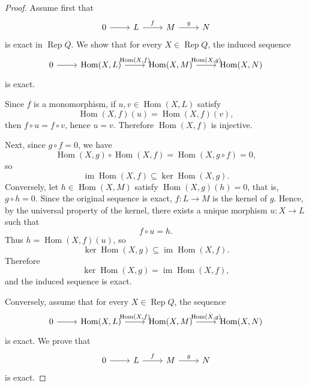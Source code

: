 \documentclass[11pt, a4paper]{report}
\begin{document}
\begin{proof}
    Assume first that
    \[
        \begin{tikzcd}
            0 \arrow[r] & L \arrow[r,"f"] & M \arrow[r,"g"] & N
        \end{tikzcd}
    \]
    is exact in $\operatorname{Rep}Q$. We show that for every $X \in \operatorname{Rep}Q$, the induced sequence
    \[
        \begin{tikzcd}
            0 \arrow[r] & {\operatorname{Hom}(X,L)} \arrow[r,"{\operatorname{Hom}(X,f)}"] &
            {\operatorname{Hom}(X,M)} \arrow[r,"{\operatorname{Hom}(X,g)}"] &
            \operatorname{Hom}(X,N)
        \end{tikzcd}
    \]
    is exact.

    Since $f$ is a monomorphism, if $u,v \in \operatorname{Hom}(X,L)$ satisfy
    \[
        \operatorname{Hom}(X,f)(u)=\operatorname{Hom}(X,f)(v),
    \]
    then $f\circ u=f\circ v$, hence $u=v$. Therefore $\operatorname{Hom}(X,f)$ is injective.

    Next, since $g\circ f=0$, we have
    \[
        \operatorname{Hom}(X,g)\circ \operatorname{Hom}(X,f)
        =\operatorname{Hom}(X,g\circ f)=0,
    \]
    so
    \[
        \operatorname{im}\operatorname{Hom}(X,f)\subseteq \ker \operatorname{Hom}(X,g).
    \]
    Conversely, let $h \in \operatorname{Hom}(X,M)$ satisfy $\operatorname{Hom}(X,g)(h)=0$, that is, $g\circ h=0$. Since the original sequence is exact, $f:L\to M$ is the kernel of $g$. Hence, by the universal property of the kernel, there exists a unique morphism $u:X\to L$ such that
    \[
        f\circ u=h.
    \]
    Thus $h=\operatorname{Hom}(X,f)(u)$, so
    \[
        \ker \operatorname{Hom}(X,g)\subseteq \operatorname{im}\operatorname{Hom}(X,f).
    \]
    Therefore
    \[
        \ker \operatorname{Hom}(X,g)=\operatorname{im}\operatorname{Hom}(X,f),
    \]
    and the induced sequence is exact.

    Conversely, assume that for every $X \in \operatorname{Rep}Q$, the sequence
    \[
        \begin{tikzcd}
            0 \arrow[r] & {\operatorname{Hom}(X,L)} \arrow[r,"{\operatorname{Hom}(X,f)}"] &
            {\operatorname{Hom}(X,M)} \arrow[r,"{\operatorname{Hom}(X,g)}"] &
            \operatorname{Hom}(X,N)
        \end{tikzcd}
    \]
    is exact. We prove that
    \[
        \begin{tikzcd}
            0 \arrow[r] & L \arrow[r,"f"] & M \arrow[r,"g"] & N
        \end{tikzcd}
    \]
    is exact.


\end{proof}
\end{document}
